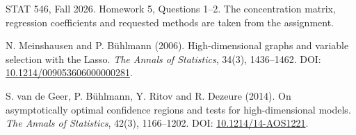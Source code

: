 \documentclass[11pt]{article}
\begin{document}
STAT 546, Fall 2026. Homework 5, Questions 1--2. The concentration matrix, regression coefficients and
requested methods are taken from the assignment.

N. Meinshausen and P. B\"uhlmann (2006). High-dimensional graphs and variable selection with the Lasso.
\emph{The Annals of Statistics}, 34(3), 1436--1462.
DOI: \href{https://doi.org/10.1214/009053606000000281}{10.1214/009053606000000281}.

S. van de Geer, P. B\"uhlmann, Y. Ritov and R. Dezeure (2014). On asymptotically optimal confidence
regions and tests for high-dimensional models. \emph{The Annals of Statistics}, 42(3), 1166--1202.
DOI: \href{https://doi.org/10.1214/14-AOS1221}{10.1214/14-AOS1221}.
\end{document}
